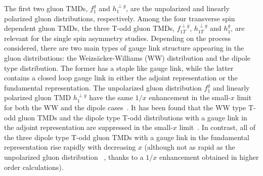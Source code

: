 \documentclass[prd,aps,preprintnumbers,fleqn,showpacs,nofootinbib,superscriptaddress]{revtex4}
\begin{document}
The first two gluon TMDs, $f_1^g$ and $h_1^{\perp g}$, are the
unpolarized and linearly polarized gluon distributions, respectively.   Among the four transverse spin dependent gluon TMDs, the three T-odd gluon TMDs, $f_{1T}^{\perp g}$, $h_{1T}^{\perp g}$ and $h_{1}^{g}$, are relevant for the single spin asymmetry studies. Depending on the process considered, there are two main types of gauge link structure appearing in the gluon distributions: the Weizs\"{a}cker-Williams (WW) distribution and the dipole type distribution. The former has a staple like gauge link, while the latter contains a closed loop gauge link in either the adjoint representation or the fundamental representation. The unpolarized gluon distribution $f_1^g$ and linearly polarized gluon TMD $h_1^{\perp g}$ have the same $1/x$ enhancement in the small-$x$ limit for both the WW and the dipole cases~\cite{Metz:2011wb,Dominguez:2011br}. It has been found that the  WW type T-odd gluon TMDs and the dipole type T-odd  distributions with a gauge link in the adjoint representation  are suppressed in the small-$x$ limit~\cite{Schafer:2013opa,Boer:2016fqd}.  In contrast, all of the three dipole type T-odd gluon TMDs with a gauge link in the fundamental representation rise rapidly with decreasing $x$ (although not as rapid as the unpolarized gluon distribution ~\cite{Hatta:2005as,Kovchegov:2003dm,Bartels:1999yt}, thanks to a $1/x$ enhancement obtained in higher order calculations). 
\end{document}
